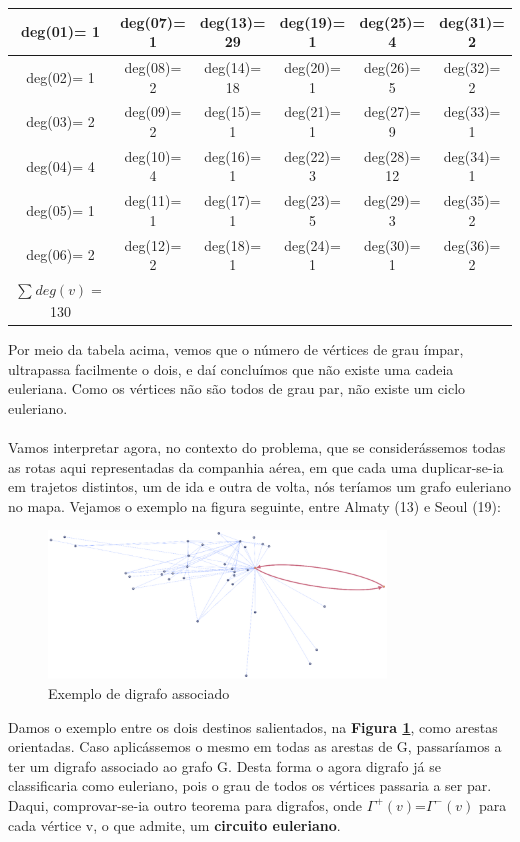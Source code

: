 \begin{center}
    \begin{tabular}{ |c|c|c|c|c|c| } 
     \hline
     deg(01)= 1 & deg(07)= 1 & deg(13)= 29 & deg(19)= 1 & deg(25)= 4 & deg(31)= 2\\
     \hline
     deg(02)= 1 & deg(08)= 2 & deg(14)= 18 & deg(20)= 1 & deg(26)= 5 & deg(32)= 2\\
     \hline
     deg(03)= 2 & deg(09)= 2 & deg(15)= 1 & deg(21)= 1 & deg(27)= 9 & deg(33)= 1\\
     \hline
     deg(04)= 4 & deg(10)= 4 & deg(16)= 1 & deg(22)= 3 & deg(28)= 12 & deg(34)= 1\\
     \hline
     deg(05)= 1 & deg(11)= 1 & deg(17)= 1 & deg(23)= 5 & deg(29)= 3 & deg(35)= 2\\
     \hline
     deg(06)= 2 & deg(12)= 2 & deg(18)= 1 & deg(24)= 1 & deg(30)= 1 & deg(36)= 2\\ 
     \hline
     $\sum_{}^{}deg(v)=$130 &   &   &   &   & \\
     \hline
    \end{tabular}
\end{center}

\indent Por meio da tabela acima, vemos que o número de vértices de grau ímpar, ultrapassa facilmente o dois, e 
daí concluímos que não existe uma cadeia euleriana. Como os vértices não são todos de grau par, não existe 
um ciclo euleriano.\\
\\
\indent Vamos interpretar agora, no contexto do problema, que se considerássemos todas as rotas aqui 
representadas da companhia aérea, em que cada uma duplicar-se-ia em trajetos distintos, um de ida e outra
de volta, nós teríamos um grafo euleriano no mapa.
Vejamos o exemplo na figura seguinte, entre Almaty (13) e Seoul (19):\\
\begin{figure}[h]
    \centering
    \includegraphics[width=0.8\textwidth]{imgs/Figura12}
    \caption{Exemplo de digrafo associado\label{fig:imagem12}}
\end{figure}
\clearpage
\indent Damos o exemplo entre os dois destinos salientados, na \textbf{Figura \ref*{fig:imagem12}}, como arestas orientadas. Caso 
aplicássemos o mesmo em todas as arestas de G, passaríamos a ter um digrafo associado ao grafo G. Desta 
forma o agora digrafo já se classificaria como euleriano, pois o grau de todos os vértices passaria a ser par.
Daqui, comprovar-se-ia outro teorema para digrafos, onde $\Gamma^+(v)$=$\Gamma^-(v)$
para cada vértice v, o que admite, um \textbf{circuito euleriano}.\\
   
